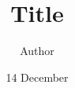 \documentclass[12pt]{article}
\title{Title}
\author{Author}
\date{14 December}
\begin{document}
\maketitle

\Blindtext
\end{document}

